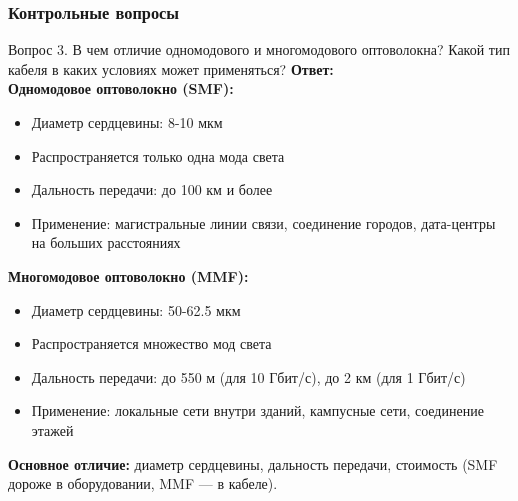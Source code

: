 \begin{frame}
\frametitle{Контрольные вопросы}

\begin{block}{Вопрос 3. В чем отличие одномодового и многомодового оптоволокна? Какой тип кабеля в каких условиях может применяться?}
\textbf{Ответ:} \\
\textbf{Одномодовое оптоволокно (SMF):}
\begin{itemize}
    \item Диаметр сердцевины: 8-10 мкм
    \item Распространяется только одна мода света
    \item Дальность передачи: до 100 км и более
    \item Применение: магистральные линии связи, соединение городов, дата-центры на больших расстояниях
\end{itemize}
\textbf{Многомодовое оптоволокно (MMF):}
\begin{itemize}
    \item Диаметр сердцевины: 50-62.5 мкм
    \item Распространяется множество мод света
    \item Дальность передачи: до 550 м (для 10 Гбит/с), до 2 км (для 1 Гбит/с)
    \item Применение: локальные сети внутри зданий, кампусные сети, соединение этажей
\end{itemize}
\textbf{Основное отличие:} диаметр сердцевины, дальность передачи, стоимость (SMF дороже в оборудовании, MMF — в кабеле).
\end{block}

\end{frame}

